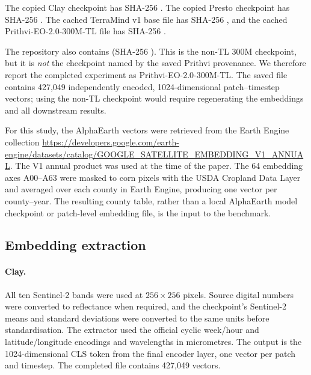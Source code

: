 The copied Clay checkpoint has SHA-256
.
The copied Presto checkpoint has SHA-256
.
The cached TerraMind v1 base file has SHA-256
,
and the cached Prithvi-EO-2.0-300M-TL file has SHA-256
.

The repository also contains
 (SHA-256
).
This is the non-TL 300M checkpoint, but it is \emph{not} the checkpoint named
by the saved Prithvi provenance.  We therefore report the completed experiment
as Prithvi-EO-2.0-300M-TL.  The saved file contains 427,049 independently
encoded, 1024-dimensional patch--timestep vectors; using the non-TL checkpoint
would require regenerating the embeddings and all downstream results.

For this study, the AlphaEarth vectors were retrieved from the Earth Engine
collection
\url{https://developers.google.com/earth-engine/datasets/catalog/GOOGLE_SATELLITE_EMBEDDING_V1_ANNUAL}.
The V1 annual product was used at the time of the paper.  The 64 embedding axes
A00--A63 were masked to corn pixels with the USDA Cropland Data Layer and
averaged over each county in Earth Engine, producing one vector per
county--year.  The resulting county table, rather than a local AlphaEarth model
checkpoint or patch-level embedding file, is the input to the benchmark.

\subsection{Embedding extraction}

\paragraph{Clay.}
All ten Sentinel-2 bands were used at $256\times256$ pixels.  Source digital
numbers were converted to reflectance when required, and the checkpoint's
Sentinel-2 means and standard deviations were converted to the same units
before standardisation.  The extractor used the official cyclic week/hour and
latitude/longitude encodings and wavelengths in micrometres.  The output is the
1024-dimensional CLS token from the final encoder layer, one vector per patch
and timestep.  The completed file contains 427,049 vectors.

